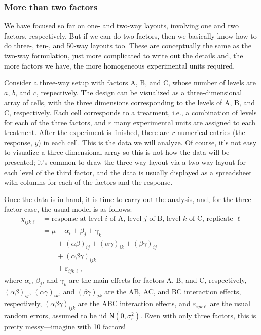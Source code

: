 \documentclass[a4paper, 12pt]{article}
\theoremstyle{plain}
\theoremstyle{definition}
\theoremstyle{remark}
\newcommand{\eps}{\varepsilon}
\newcommand{\nm}{\mathsf{N}}
\begin{document}
\subsubsection*{More than two factors}

We have focused so far on one- and two-way layouts, involving one and two factors, respectively.  But if we can do two factors, then we basically know how to do three-, ten-, and 50-way layouts too.  These are conceptually the same as the two-way formulation, just more complicated to write out the details and, the more factors we have, the more homogeneous experimental units required.  

Consider a three-way setup with factors A, B, and C, whose number of levels are $a$, $b$, and $c$, respectively.  The design can be visualized as a three-dimensional array of cells, with the three dimensions corresponding to the levels of A, B, and C, respectively.  Each cell corresponds to a treatment, i.e., a combination of levels for each of the three factors, and $r$ many experimental units are assigned to each treatment.  After the experiment is finished, there are $r$ numerical entries (the response, $y$) in each cell.  This is the data we will analyze.  Of course, it's not easy to visualize a three-dimensional array so this is not how the data will be presented; it's common to draw the three-way layout via a two-way layout for each level of the third factor, and the data is usually displayed as a spreadsheet with columns for each of the factors and the response.  

Once the data is in hand, it is time to carry out the analysis, and, for the three factor case, the usual model is as follows:
\begin{align*}
y_{ijk\ell} & = \text{response at level $i$ of A, level $j$ of B, level $k$ of C, replicate $\ell$} \\
& = \mu + \alpha_i + \beta_j + \gamma_k \\
& \qquad + (\alpha\beta)_{ij} + (\alpha\gamma)_{ik} + (\beta\gamma)_{ij} \\
& \qquad + (\alpha\beta\gamma)_{ijk} \\
& \qquad + \eps_{ijk\ell}, 
\end{align*}
where $\alpha_i$, $\beta_j$, and $\gamma_k$ are the main effects for factors A, B, and C, respectively, $(\alpha\beta)_{ij}$, $(\alpha\gamma)_{ik}$, and $(\beta\gamma)_{jk}$ are the AB, AC, and BC interaction effects, respectively, $(\alpha\beta\gamma)_{ijk}$ are the ABC interaction effects, and $\eps_{ijk\ell}$ are the usual random errors, assumed to be iid $\nm(0,\sigma_\eps^2)$.  Even with only three factors, this is pretty messy---imagine with 10 factors!  
\end{document}
